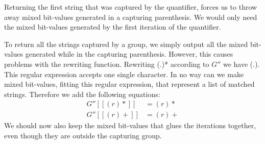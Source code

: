 Returning the first string that was captured by the quantifier, forces
us to throw away mixed bit-values generated in a capturing
parenthesis. We would only need the mixed bit-values generated by the
first iteration of the quantifier. 

To return all the strings captured by a group, we simply output all
the mixed bit-values generated while in the capturing
parenthesis. However, this causes problems with the rewriting
function. Rewriting \textsf{(.)*} according to $G''$ we have
\textsf{(.)}. This regular expression accepts one single character. In
no way can we make mixed bit-values, fitting this regular expression,
that represent a list of matched strings. Therefore we add the
following equations:
\begin{align*}
  G''[[(r)*]] &= (r)* \\
  G''[[(r)+]] &= (r)+
\end{align*}
We should now also keep the mixed bit-values that glues the iterations
together, even though they are outside the capturing group.







